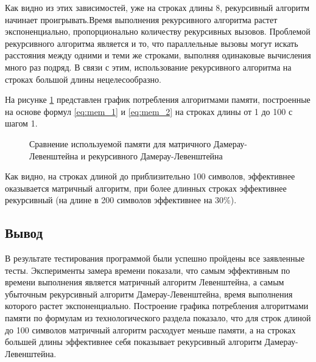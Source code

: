 \documentclass[a4paper,12pt]{article}
\begin{document}
        Как видно из этих зависимостей, уже на строках длины 8, рекурсивный алгоритм начинает проигрывать.Время выполнения рекурсивного алгоритма растет экспоненциально, пропорционально количеству рекурсивных вызовов. Проблемой рекурсивного алгоритма является и то, что параллельные вызовы могут искать расстояния между одними и теми же строками, выполняя одинаковые вычисления много раз подряд. В связи с этим, использование рекурсивного алгоритма на строках большой длины нецелесообразно.
        
        На рисунке \ref{fig:graf_3} представлен график потребления алгоритмами памяти, построенные на основе формул \ref{eq:mem_1} и \ref{eq:mem_2} на строках длины от 1 до 100 с шагом 1.
        
        \begin{figure}[h]
            \caption{Сравнение используемой памяти для матричного Дамерау-Левенштейна и рекурсивного Дамерау-Левенштейна}
            \label{fig:graf_3}
        \end{figure}
        
        Как видно, на строках длиной до приблизительно 100 символов, эффективнее оказывается матричный алгоритм, при более длинных строках эффективнее рекурсивный (на длине в 200 символов эффективнее на 30\%).
        
       \subsection*{Вывод}
       В результате тестирования программой были успешно пройдены все заявленные тесты. Эксперименты замера времени показали, что самым эффективным по времени выполнения является матричный алгоритм Левенштейна, а самым убыточным рекурсивный алгоритм Дамерау-Левенштейна, время выполнения которого растет экспоненциально. Построение графика потребления алгоритмами памяти по формулам из технологического раздела показало, что для строк длиной до 100 символов матричный алгоритм расходует меньше памяти, а на строках большей длины эффективнее себя показывает рекурсивный алгоритм Дамерау-Левенштейна.
        
\end{document}
